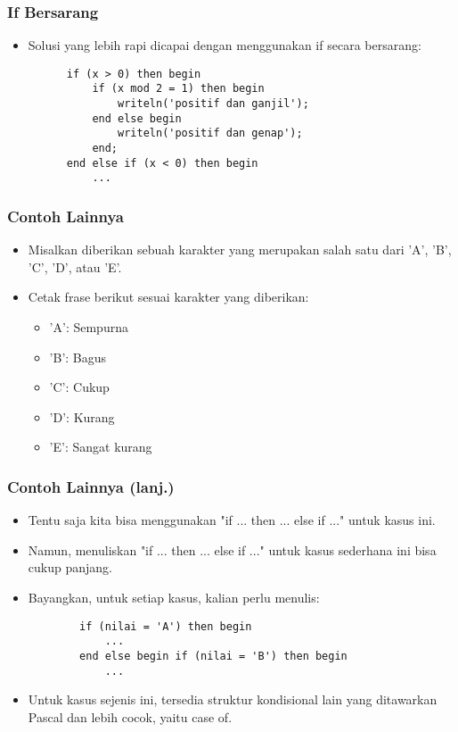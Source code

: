 \documentclass{beamer}
\begin{document}
\begin{frame}[fragile]
\frametitle{If Bersarang}
\begin{itemize}
	\item Solusi yang lebih rapi dicapai dengan menggunakan if secara bersarang:
	\begin{lstlisting}
	  if (x > 0) then begin
	      if (x mod 2 = 1) then begin
	          writeln('positif dan ganjil');
	      end else begin
	          writeln('positif dan genap');
	      end;
	  end else if (x < 0) then begin
	      ...
	\end{lstlisting}
\end{itemize}
\end{frame}

\begin{frame}
\frametitle{Contoh Lainnya}
\begin{itemize}
	\item Misalkan diberikan sebuah karakter yang merupakan salah satu dari 'A', 'B', 'C', 'D', atau 'E'.
	\item Cetak frase berikut sesuai karakter yang diberikan:
	\begin{itemize}
		\item 'A': Sempurna
		\item 'B': Bagus
		\item 'C': Cukup
		\item 'D': Kurang
		\item 'E': Sangat kurang
	\end{itemize}
\end{itemize}
\end{frame}

\begin{frame}[fragile]
\frametitle{Contoh Lainnya (lanj.)}
\begin{itemize}
	\item Tentu saja kita bisa menggunakan "if ... then ... else if ..." untuk kasus ini.
	\item Namun, menuliskan "if ... then ... else if ..." untuk kasus sederhana ini bisa cukup panjang.
	\item Bayangkan, untuk setiap kasus, kalian perlu menulis:
	\begin{lstlisting}
		if (nilai = 'A') then begin
		    ...
		end else begin if (nilai = 'B') then begin
		    ...
	\end{lstlisting}	
	\item Untuk kasus sejenis ini, tersedia struktur kondisional lain yang ditawarkan Pascal dan lebih cocok, yaitu \alert{case of}.
\end{itemize}
\end{frame}
\end{document}
